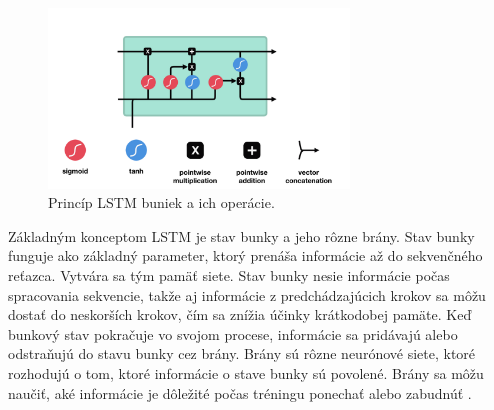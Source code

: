 \begin{figure}[!htbp]
  \centering
  \includegraphics[width=8cm]{img/lstm.png}
  \caption{Princíp LSTM buniek a ich operácie.}
  \label{lstm}
\end{figure}

Základným konceptom LSTM je stav bunky a jeho rôzne brány. Stav bunky funguje ako základný parameter, ktorý prenáša informácie až do sekvenčného reťazca. Vytvára sa tým pamäť siete. Stav bunky nesie informácie počas spracovania sekvencie, takže aj informácie z predchádzajúcich krokov sa môžu dostať do neskorších krokov, čím sa znížia účinky krátkodobej pamäte. Keď bunkový stav pokračuje vo svojom procese, informácie sa pridávajú alebo odstraňujú do stavu bunky cez brány. Brány sú rôzne neurónové siete, ktoré rozhodujú o tom, ktoré informácie o stave bunky sú povolené. Brány sa môžu naučiť, aké informácie je dôležité počas tréningu ponechať alebo zabudnúť \cite{lstm}.


